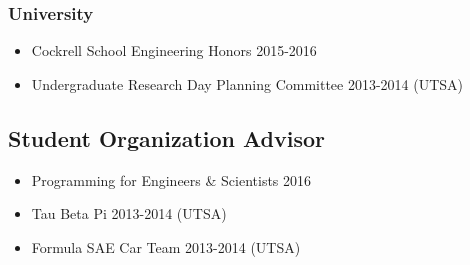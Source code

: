 \subsubsection*{University}
\begin{itemize}
    \item Cockrell School Engineering Honors 2015-2016
    \item Undergraduate Research Day Planning Committee 2013-2014 (UTSA)
\end{itemize}

\subsection*{Student Organization Advisor}
\begin{itemize}
    \item Programming for Engineers \& Scientists 2016
    \item Tau Beta Pi 2013-2014 (UTSA)
    \item Formula SAE Car Team 2013-2014 (UTSA)
\end{itemize}



